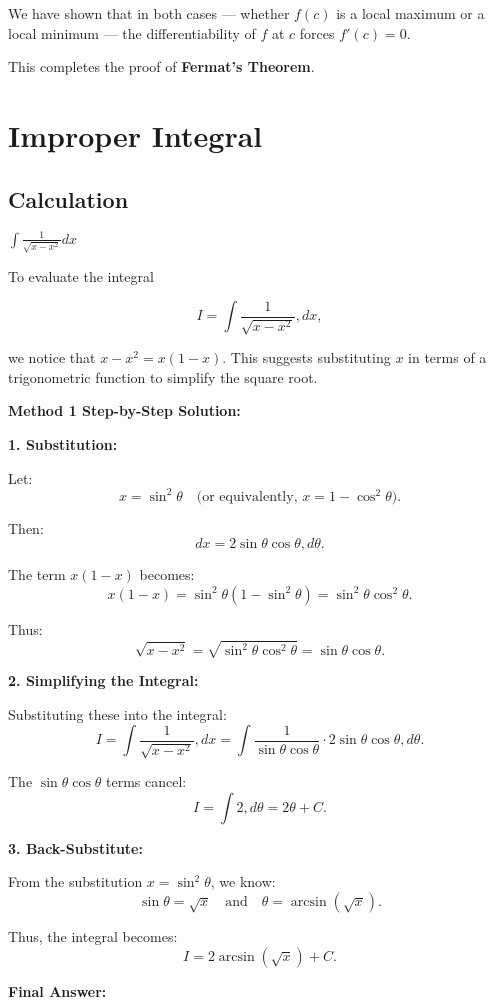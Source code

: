\documentclass[a4paper,12pt]{book}
\begin{document}
We have shown that in both cases — whether \( f(c) \) is a local maximum or a local minimum — the differentiability of \( f \) at \( c \) forces \( f'(c) = 0 \).

This completes the proof of \textbf{Fermat’s Theorem}.

\chapter{Improper Integral}

\section{Calculation}

\(\int \frac{1}{\sqrt{x-x^2}}dx\) %

To evaluate the integral

\[
I = \int \frac{1}{\sqrt{x - x^2}} , dx,
\]

we notice that \(x - x^2 = x(1 - x)\). This suggests substituting \(x\) in terms of a trigonometric function to simplify the square root.

\textbf{Method 1 Step-by-Step Solution:}

\textbf{1. Substitution:}

Let:
\[
x = \sin^2\theta \quad \text{(or equivalently, } x = 1 - \cos^2\theta\text{)}.
\]

Then:
\[
dx = 2\sin\theta \cos\theta , d\theta.
\]

The term \(x(1 - x)\) becomes:
\[
x(1 - x) = \sin^2\theta(1 - \sin^2\theta) = \sin^2\theta \cos^2\theta.
\]

Thus:
\[
\sqrt{x - x^2} = \sqrt{\sin^2\theta \cos^2\theta} = \sin\theta \cos\theta.
\]

\textbf{2. Simplifying the Integral:}

Substituting these into the integral:
\[
I = \int \frac{1}{\sqrt{x - x^2}} , dx = \int \frac{1}{\sin\theta \cos\theta} \cdot 2\sin\theta \cos\theta , d\theta.
\]

The \(\sin\theta \cos\theta\) terms cancel:
\[
I = \int 2 , d\theta = 2\theta + C.
\]

\textbf{3. Back-Substitute:}

From the substitution \(x = \sin^2\theta\), we know:
\[
\sin\theta = \sqrt{x} \quad \text{and} \quad \theta = \arcsin(\sqrt{x}).
\]

Thus, the integral becomes:
\[
I = 2\arcsin(\sqrt{x}) + C.
\]

\textbf{Final Answer:}
\end{document}
